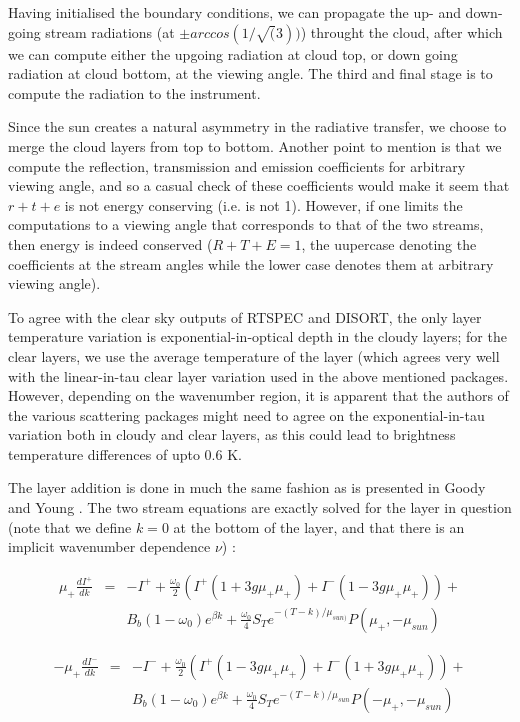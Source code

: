 \documentclass[11pt]{article}
\begin{document}
Having initialised the boundary conditions, we can propagate the up- and down-
going stream radiations (at $\pm arccos(1/\sqrt(3))$) throught the cloud, 
after which we can compute either the upgoing radiation at cloud top, or down 
going radiation at cloud bottom, at the viewing angle. The third and final 
stage is to compute the radiation to the instrument.

Since the sun creates a natural asymmetry in the radiative transfer, we 
choose to merge the cloud layers from top to bottom. Another point to mention 
is that we compute the reflection, transmission and emission coefficients for 
arbitrary viewing angle, and so a casual check of these coefficients would 
make it seem that $r+t+e$ is not energy conserving (i.e. is not 1). However, 
if one limits the computations to a viewing angle that corresponds to that of 
the two streams, then energy is indeed conserved ($R+T+E = 1$, the uupercase 
denoting the coefficients at the stream angles while the lower case denotes
them at arbitrary viewing angle). 

To agree with the clear sky outputs of \textsf{RTSPEC} and \textsf{DISORT}, 
the only layer temperature variation is exponential-in-optical depth in the 
cloudy layers; 
for the clear layers, we use the average temperature of the layer (which 
agrees very well with the linear-in-tau clear layer variation used in the 
above mentioned packages. However, depending on the wavenumber region, it is
apparent that the authors of the various scattering packages might need to 
agree on the exponential-in-tau variation both in cloudy and clear layers, as 
this could lead to brightness temperature differences of upto 0.6 K.

The layer addition is done in much the same fashion as is presented in Goody 
and Young \cite{goo:89}. The two stream equations are exactly solved for 
the layer in question (note that we define $k=0$ at the bottom of the 
layer, and that there is an implicit wavenumber dependence $\nu$) : 

\[
\begin{array}{ccc}
\mu_{+} \frac{dI^{+}}{dk} & = & -I^{+} + \frac{\omega_{0}}{2} 
(I^{+}(1 + 3g\mu_{+} \mu_{+}) + I^{-}(1 - 3g\mu_{+} \mu_{+})) + \\
                             & & B_{b}(1-\omega_{0})e^{\beta k} + 
\frac{\omega_{0}}{4}S_{T}e^{-(T-k)/\mu_{sun)}}P(\mu_{+},-\mu_{sun})
\end{array}
\]

\[
\begin{array}{ccc}
-\mu_{+} \frac{dI^{-}}{dk} & = & -I^{-} + \frac{\omega_{0}}{2} 
(I^{+}(1 - 3g\mu_{+} \mu_{+}) + I^{-}(1 + 3g\mu_{+} \mu_{+})) + \\
                            & & B_{b}(1-\omega_{0})e^{\beta k} + 
\frac{\omega_{0}}{4} S_{T} e^{-(T-k)/\mu_{sun}}P(-\mu_{+},-\mu_{sun})
\end{array}
\]
\end{document}
